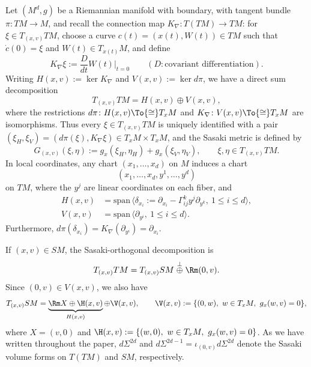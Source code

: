 Let $(M^d,g)$ be a Riemannian manifold with boundary, with tangent bundle $\pi\colon TM \to M$, and recall
the connection map $K_\nabla\colon T(TM) \to TM$: for $\xi\in T_{(x,v)} TM$, choose a curve $c(t) = (x(t),W(t)) \in TM$
such that $\dot c(0) = \xi$ and $W(t) \in T_{x(t)} M$, and define
\begin{equation*}
K_\nabla \xi := \frac{D}{dt} W(t)|_{t=0} \qquad (D:\text{covariant differentiation}).
\end{equation*}
Writing $H(x,v) := \ker K_\nabla$ and $V(x,v) := \ker d\pi$, we have a direct sum decomposition
\begin{equation*}
T_{(x,v)} TM = H(x,v)\oplus V(x,v),
\end{equation*}
where the restrictions $d\pi \colon H(x,v) \To{\cong}T_x M$ and $K_\nabla\colon V(x,v)
\To{\cong} T_x M$ are isomorphisms. Thus every $\xi\in T_{(x,v)} TM$ is uniquely
identified with a pair $(\xi_H,\xi_V) = (d\pi(\xi), K_\nabla \xi) \in T_xM \times T_x M$, and the Sasaki metric is defined by
\begin{equation*}
G_{(x,v)} (\xi,\eta) := g_x(\xi_H, \eta_H) + g_x(\xi_V,\eta_V), \qquad \xi,\eta\in T_{(x,v)}TM.
\end{equation*}
In local coordinates, any chart $(x_1,\dots,x_d)$ on $M$ induces a chart
\[
(x_1,\dots,x_d, y^1,\dots,y^d)
\]
on $TM$, where the $y^j$ are linear coordinates on each fiber, and
\begin{align*}
H(x,v) &= \mathrm{span}\, \bigl\langle \delta_{x_i} := \partial_{x_i} - \Gamma_{ij}^k y^j \partial_{y^k},\ 1\le i\le d\bigr\rangle, \\
V(x,v) &= \mathrm{span}\, \bigl\langle \partial_{y^i},\ 1\le i\le d\bigr\rangle.
\end{align*}
Furthermore, $d\pi (\delta_{x_i}) = K_\nabla (\partial_{y^i}) = \partial_{x_i}$.

If $(x,v)\in SM$, the Sasaki-orthogonal decomposition is
\begin{equation*}
T_{(x,v)} TM = T_{(x,v)} SM \stackrel{\perp}{\oplus} \Rm (0,v).
\end{equation*}
Since $(0,v)\in V(x,v)$, we also have
\begin{equation*}
T_{(x,v)} SM = \underbrace{\Rm X \oplus \H(x,v)}_{H(x,v)} \oplus \V(x,v), \qquad \V(x,v) := \{(0,w),\ w\in T_xM,\ g_x(w,v) = 0\},
\end{equation*}
where $X = (v,0)$ and $\H(x,v) := \{(w,0),\ w\in T_xM,\ g_x(w,v) = 0\}$. As we have written throughout the paper, $d\Sigma^{2d}$
and $d\Sigma^{2d-1} = \iota_{(0,v)} d\Sigma^{2d}$ denote the Sasaki volume forms on $T(TM)$ and $SM$, respectively.

